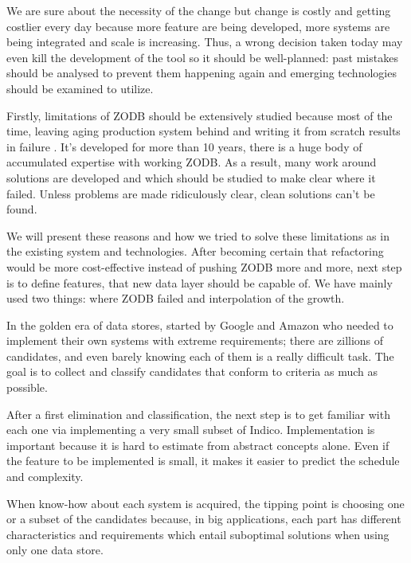 \par We are sure about the necessity of the change but change is costly and getting costlier every day because more feature are being developed, more systems are being integrated and scale is increasing. Thus, a wrong decision taken today may even kill the development of the tool so it should be well-planned: past mistakes should be analysed to prevent them happening again and emerging technologies should be examined to utilize.

\par Firstly, limitations of \textsc{ZODB} should be extensively studied because most of the time, leaving aging production system behind and writing it from scratch results in failure \cite{rewrite-cost}\cite{rewrite-cost-2}. It's developed for more than 10 years, there is a huge body of accumulated expertise with working \textsc{ZODB}. As a result, many work around solutions are developed and which should be studied to make clear where it failed. Unless problems are made ridiculously clear, clean solutions can't be found\cite{pracprog}.

\par We will present these reasons and how we tried to solve these limitations as in the existing system and technologies. After becoming certain that refactoring would be more cost-effective instead of pushing \textsc{ZODB} more and more, next step is to define features, that new data layer should be capable of. We have mainly used two things: where \textsc{ZODB} failed and interpolation of the growth.

\par In the golden era of data stores, started by Google\cite{bigtable}\cite{chubby}\cite{mapreduce} and Amazon\cite{dynamo} who needed to implement their own systems with extreme requirements; there are zillions of candidates, and even barely knowing each of them is a really difficult task. The goal is to collect and classify candidates that conform to criteria as much as possible.

\par After a first elimination and classification, the next step is to get familiar with each one via implementing a very small subset of Indico. Implementation is important because it is hard to estimate from abstract concepts alone. Even if the feature to be implemented is small, it makes it easier to predict the schedule and complexity.

\par When know-how about each system is acquired, the tipping point is choosing one or a subset of the candidates because, in big applications, each part has different characteristics and requirements which entail suboptimal solutions when using only one data store.

